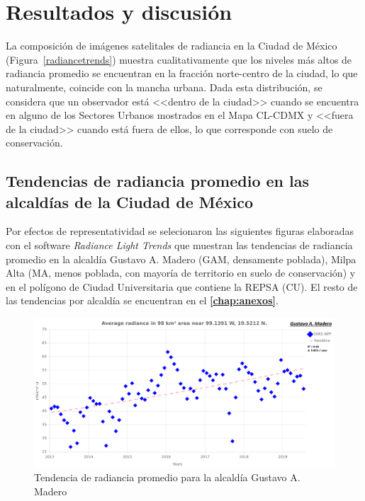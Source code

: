 \chapter{Resultados y discusión}

La composición de imágenes satelitales de radiancia en la Ciudad de México (Figura~\ref{radiancetrends}) muestra cualitativamente que los niveles más altos de radiancia promedio se encuentran en la fracción norte-centro de la ciudad, lo que naturalmente, coincide con la mancha urbana. Dada esta distribución, se considera que un observador está <<dentro de la ciudad>> cuando se encuentra en alguno de los Sectores Urbanos mostrados en el Mapa CL-CDMX y <<fuera de la ciudad>> cuando está fuera de ellos, lo que corresponde con suelo de conservación. 

\section{Tendencias de radiancia promedio en las alcaldías de la Ciudad de México}
\label{subsec:tendenciasradiancia}

Por efectos de representatividad se selecionaron las siguientes figuras elaboradas con el software \textit{Radiance Light Trends} que muestran las tendencias de radiancia promedio en la alcaldía Gustavo A. Madero (GAM, densamente poblada), Milpa Alta (MA, menos poblada, con mayoría de territorio en suelo de conservación) y en el polígono de Ciudad Universitaria que contiene la REPSA (CU). El resto de las tendencias por alcaldía se encuentran en el \textbf{\autoref{chap:anexos}}.

\begin{figure}[htb]
  \centering
    \includegraphics[width=1\textwidth]{GAM}
  \caption{Tendencia de radiancia promedio para la alcaldía Gustavo A. Madero}
  \label{radiancetrendsgam}
\end{figure}

